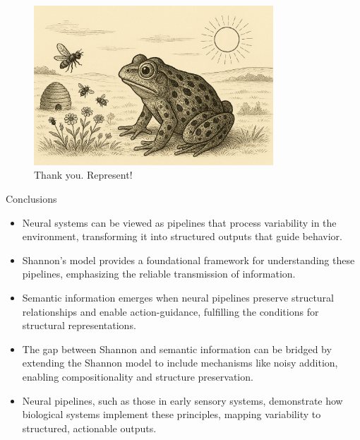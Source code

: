 \documentclass[10pt, aspectratio=169, handout]{beamer}
\begin{document}
    
    \begin{frame}
        \begin{figure}[h!]
            \centering
            \includegraphics[width=0.8\textwidth]{images/frog_world.png}
            \caption{\Huge Thank you. Represent! }
            
        \end{figure}
      
    \end{frame}
    


    \begin{frame}[label=conclusions2 ]{Conclusions}

    \begin{itemize}
        \item Neural systems can be viewed as pipelines that process variability in the environment, transforming it into structured outputs that guide behavior.
        \item Shannon's model provides a foundational framework for understanding these pipelines, emphasizing the reliable transmission of information.
        \item Semantic information emerges when neural pipelines preserve structural relationships and enable action-guidance, fulfilling the conditions for structural representations.
        \item The gap between Shannon and semantic information can be bridged by extending the Shannon model to include mechanisms like noisy addition, enabling compositionality and structure preservation.
        \item Neural pipelines, such as those in early sensory systems, demonstrate how biological systems implement these principles, mapping variability to structured, actionable outputs.
    \end{itemize}

\end{frame}
\end{document}
